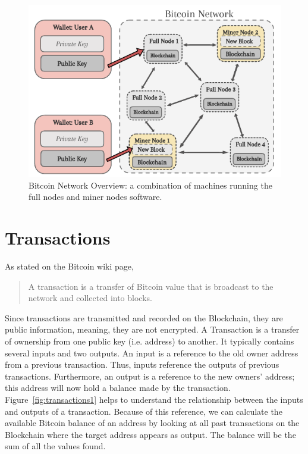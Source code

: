 \documentclass[../../thesis.tex]{subfiles}
\begin{document}
\begin{figure}[H]
\centering
\includegraphics[width=\textwidth]{content/bitcoin/img/bitcoin_network}
\caption{Bitcoin Network Overview: a combination of machines running the full nodes and miner nodes software.
}
\label{fig:bitcoin_network}
\end{figure}

\section{Transactions}
\label{sec:bitcoin_transactions}

As stated on the Bitcoin wiki page, \begin{quotation}
  A transaction is a transfer of Bitcoin value that is broadcast to the network and collected into blocks.
\end{quotation}
 Since transactions are transmitted and recorded on the Blockchain, they are public information, meaning, they are not encrypted.  A Transaction is a transfer of ownership from one public key (i.e. address) to another. It typically contains several inputs and two outputs. An input is a reference to the old owner address from a previous transaction. Thus, inputs reference the outputs of previous transactions. Furthermore, an output is a reference to the new owners' address; this address will now hold a balance made by the transaction. Figure~\ref{fig:transactions1} helps to understand the relationship between the inputs and outputs of a transaction. Because of this reference, we can calculate the available Bitcoin balance of an address by looking at all past transactions on the Blockchain where the target address appears as output. The balance will be the sum of all the values found. 
 
\end{document}
